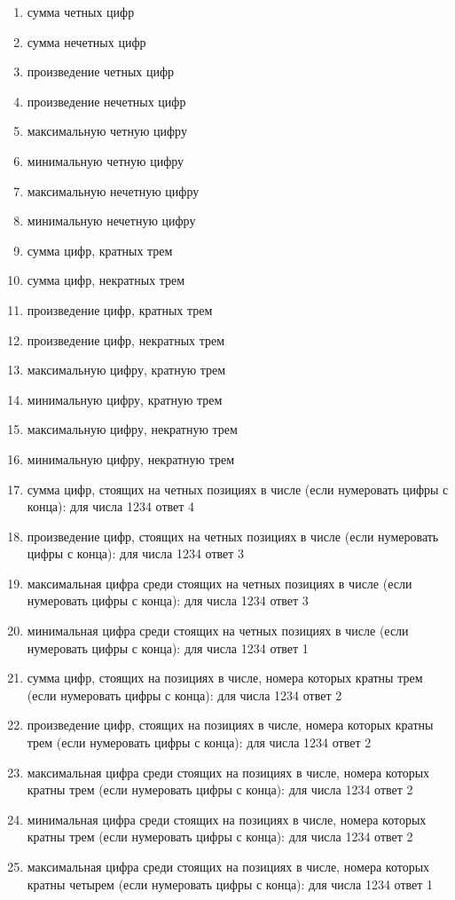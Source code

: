 \begin{enumerate}
\item сумма четных цифр
\item сумма нечетных цифр
\item произведение четных цифр
\item произведение нечетных цифр
\item максимальную четную цифру
\item минимальную четную цифру
\item максимальную нечетную цифру
\item минимальную нечетную цифру

\item сумма цифр, кратных трем
\item сумма цифр, некратных трем
\item произведение цифр, кратных трем
\item произведение цифр, некратных трем
\item максимальную цифру, кратную трем
\item минимальную цифру, кратную трем
\item максимальную цифру, некратную трем
\item минимальную цифру, некратную трем

\item сумма цифр, стоящих на четных позициях в числе (если нумеровать цифры с конца): для числа 1234 ответ 4
\item произведение цифр, стоящих на четных позициях в числе (если нумеровать цифры с конца): для числа 1234 ответ 3
\item максимальная цифра среди стоящих на четных позициях в числе (если нумеровать цифры с конца): для числа 1234 ответ 3
\item минимальная цифра среди стоящих на четных позициях в числе (если нумеровать цифры с конца): для числа 1234 ответ 1

\item сумма цифр, стоящих на позициях в числе, номера которых кратны трем (если нумеровать цифры с конца): для числа 1234 ответ 2
\item произведение цифр, стоящих на позициях в числе, номера которых кратны трем (если нумеровать цифры с конца): для числа 1234 ответ 2
\item максимальная цифра среди стоящих на позициях в числе, номера которых кратны трем (если нумеровать цифры с конца): для числа 1234 ответ 2
\item минимальная цифра среди стоящих на позициях в числе, номера которых кратны трем (если нумеровать цифры с конца): для числа 1234 ответ 2

\item максимальная цифра среди стоящих на позициях в числе, номера которых кратны четырем (если нумеровать цифры с конца): для числа 1234 ответ 1 

\end{enumerate}


